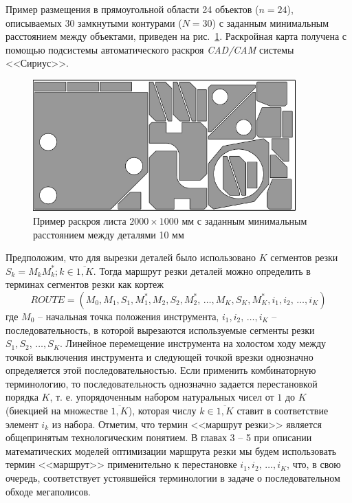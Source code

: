 \documentclass[11pt,twoside,openany]{report}
\begin{document}
Пример размещения в прямоугольной области 24 объектов
($n=24$),
описываемых 30 замкнутыми контурами
($N=30$)
с заданным минимальным расстоянием между объектами,
приведен на рис.~\ref{nesting}.
Раскройная карта получена с
помощью подсистемы автоматического раскроя
\textit{CAD/CAM}
системы <<Сириус>>.

\begin{figure}[h]
  \begin{center}
  \includegraphics[width=0.9\textwidth]{nesting.png}
  \caption{Пример раскроя листа $2000 \times 1000$ мм с заданным минимальным расстоянием между деталями 10 мм}
  \label{nesting}
  \end{center}
\end{figure}

Предположим, что для вырезки деталей было использовано
$K$
сегментов резки
$S_k=M_kM^*_k; k \in \overline{1,K}$.
Тогда маршрут резки деталей можно определить
в терминах сегментов резки как кортеж
\begin{equation}
  ROUTE = (
    M_0, M_1, S_1, M_1^*, M_2, S_2, M_2^*, \,\dots, M_K, S_K, M_K^*,
    i_1, i_2, \,\dots, i_K
  )
  \label{tuple}
\end{equation}
где
$M_0$
-- начальная точка положения инструмента,
$i_1, i_2, \,\dots, i_K$
– последовательность, в которой вырезаются используемые сегменты резки
$S_1, S_2, \,\dots, S_K$.
Линейное перемещение инструмента на холостом ходу
между точкой выключения инструмента и следующей точкой врезки
однозначно определяется этой последовательностью.
Если применить комбинаторную терминологию,
то последовательность однозначно задается перестановкой порядка
$K$,
т. е. упорядоченным набором натуральных чисел от $1$ до $K$
(биекцией на множестве $\overline{1,K}$),
которая числу
$k \in \overline{1,K}$
ставит в соответствие элемент
$i_k$ из набора.
Отметим, что термин <<маршрут резки>> является
общепринятым технологическим понятием.
В главах 3 -- 5 при описании математических моделей оптимизации
маршрута резки мы будем использовать термин <<маршрут>>
применительно к перестановке
$i_1, i_2, \,\dots, i_K$,
что, в свою очередь, соответствует устоявшейся
терминологии в задаче о последовательном обходе мегаполисов.
\end{document}
